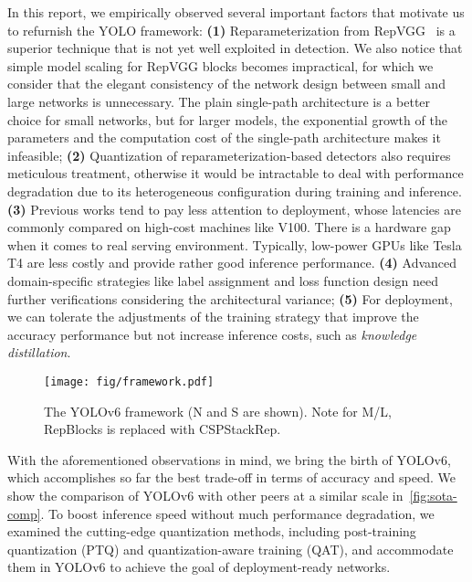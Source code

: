 \documentclass[10pt,twocolumn,letterpaper]{article}
\begin{document}
In this report, we empirically observed several important factors that motivate us to refurnish the YOLO framework: \textbf{(1)} Reparameterization from RepVGG~\cite{ding2021repvgg} is a superior technique that is not yet well exploited in detection. We also notice that simple model scaling for RepVGG blocks becomes impractical, for which we consider that the elegant consistency of the network design between small and large networks is unnecessary. The plain single-path architecture is a better choice for small networks, but for larger models, the exponential growth of the parameters and the computation cost of the single-path architecture makes it infeasible; \textbf{(2)} Quantization of reparameterization-based detectors also requires meticulous treatment, otherwise it would be intractable to deal with performance degradation due to its heterogeneous configuration during training and inference.  \textbf{(3)} Previous works \cite{yolov5,xu2022pp,ge2021yolox,wang2022yolov7} tend to pay less attention to deployment, whose latencies are commonly compared on high-cost machines like V100. There is a hardware  gap when it comes to real serving environment. Typically, low-power GPUs like Tesla T4 are less costly and provide rather good inference performance.  \textbf{(4)} Advanced domain-specific strategies like label assignment and loss function design need further verifications considering the architectural variance;
\textbf{(5)} For deployment, we can tolerate the adjustments of the training strategy that improve the accuracy performance but not increase inference costs, such as \emph{knowledge distillation}.


\begin{figure*}[t]
  \begin{center}
    \texttt{[image: fig/framework.pdf]}
  \end{center}
    \caption{The YOLOv6 framework (N and S are shown). Note for M/L, RepBlocks is replaced with CSPStackRep.}
    \label{fig:framework}
\end{figure*}



With the aforementioned observations in mind, we bring the birth of YOLOv6, which accomplishes so far the best trade-off in terms of accuracy and speed. We show the comparison of YOLOv6 with other peers at a similar scale in~\cref{fig:sota-comp}. To boost inference speed without much performance degradation, we examined the cutting-edge quantization methods, including post-training quantization (PTQ) and quantization-aware training (QAT), and accommodate them in YOLOv6 to achieve the goal of deployment-ready networks.
\end{document}
